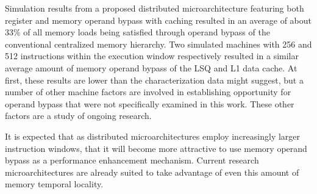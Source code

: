 \documentclass[10pt,dvips]{article}
\begin{document}
Simulation results from a proposed distributed microarchitecture
featuring both register and memory operand bypass with caching
resulted in an average of about 33\% of all memory loads being
satisfied through operand bypass of the conventional centralized
memory hierarchy.  
Two simulated machines with 256 and 512 instructions 
within the execution window respectively
resulted in a similar average amount of
memory operand bypass of the LSQ and L1 data cache.
At first, these results are lower than the characterization data might
suggest, but a number of other machine factors are involved
in establishing opportunity for operand bypass that were not specifically
examined in this work.  
These other factors are a study of ongoing research.

It is expected that as distributed microarchitectures employ
increasingly larger instruction windows, that it will become more
attractive to use memory operand bypass as a performance enhancement
mechanism.
Current research microarchitectures are already suited to take
advantage of even this amount of memory temporal locality.
%


%
\end{document}
